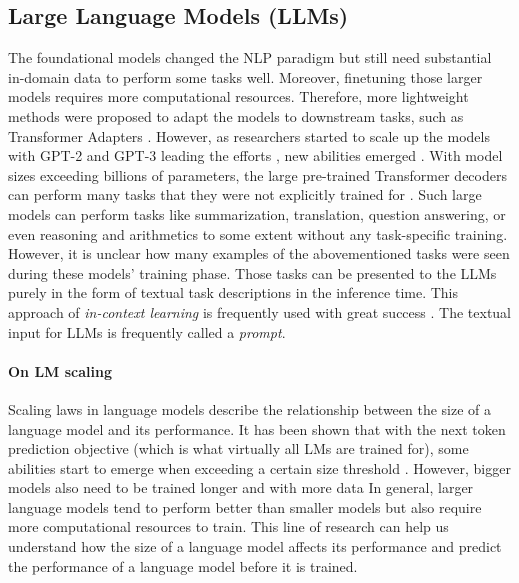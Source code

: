 \subsection{Large Language Models (LLMs)}
The foundational models changed the NLP paradigm but still need substantial in-domain data to perform some tasks well.
Moreover, finetuning those larger models requires more computational resources.
Therefore, more lightweight methods were proposed to adapt the models to downstream tasks, such as Transformer Adapters \cite{pfeiffer2020AdapterHub}.
However, as researchers started to scale up the models with GPT-2 and GPT-3 leading the efforts \cite{radford2019language,brown2020language}, new abilities emerged \cite{wei2022emergent}.
With model sizes exceeding billions of parameters, the large pre-trained Transformer decoders can perform many tasks that they were not explicitly trained for \cite{brown2020language}.
Such large models can perform tasks like summarization, translation, question answering, or even reasoning and arithmetics to some extent without any task-specific training.
However, it is unclear how many examples of the abovementioned tasks were seen during these models' training phase.
Those tasks can be presented to the LLMs purely in the form of textual task descriptions in the inference time.
This approach of \emph{in-context learning} is frequently used with great success \cite{min2022rethinking,dong2022survey}.
The textual input for LLMs is frequently called a \emph{prompt}.

\paragraph{On LM scaling}
Scaling laws in language models describe the relationship between the size of a language model and its performance.
It has been shown that with the next token prediction objective (which is what virtually all LMs are trained for), some abilities start to emerge when exceeding a certain size threshold \cite{kaplan2020scaling}.
However, bigger models also need to be trained longer and with more data \cite{hoffmann2022training}
In general, larger language models tend to perform better than smaller models but also require more computational resources to train.
This line of research can help us understand how the size of a language model affects its performance and predict the performance of a language model before it is trained.

